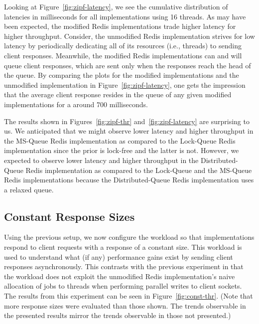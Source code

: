 \documentclass[sigconf, screen]{acmart}
\begin{document}
Looking at Figure~\ref{fig:zipf-latency}, we see the cumulative distribution of latencies in milliseconds for all implementations using 16 threads.
As may have been expected, the modified Redis implementations trade higher latency for higher throughput.
Consider, the unmodified Redis implementation strives for low latency by periodically dedicating all of its resources (i.e., threads) to sending client responses.
Meanwhile, the modified Redis implementations can and will queue client responses, which are sent only when the responses reach the head of the queue.
By comparing the plots for the modified implementations and the unmodified implementation in Figure~\ref{fig:zipf-latency}, one gets the impression that the average client response resides in the queue of any given modified implementations for a around 700 milliseconds.

The results shown in Figures~\ref{fig:zipf-thr} and~\ref{fig:zipf-latency} are surprising to us.
We anticipated that we might observe lower latency and higher throughput in the MS-Queue Redis implementation as compared to the Lock-Queue Redis implementation since the prior is lock-free and the latter is not.
However, we expected to observe lower latency and higher throughput in the Distributed-Queue Redis implementation as compared to the Lock-Queue and the MS-Queue Redis implementations because the Distributed-Queue Redis implementation uses a relaxed queue.


\subsection{Constant Response Sizes}
Using the previous setup, we now configure the workload so that implementations respond to client requests with a response of a constant size.
This workload is used to understand what (if any) performance gains exist by sending client responses asynchronously.
This contrasts with the previous experiment in that the workload does not exploit the unmodified Redis implementation's naive allocation of jobs to threads when performing parallel writes to client sockets.
The results from this experiment can be seen in Figure~\ref{fig:const-thr}.
(Note that more response sizes were evaluated than those shown. The trends observable in the presented results mirror the trends observable in those not presented.)
\end{document}
